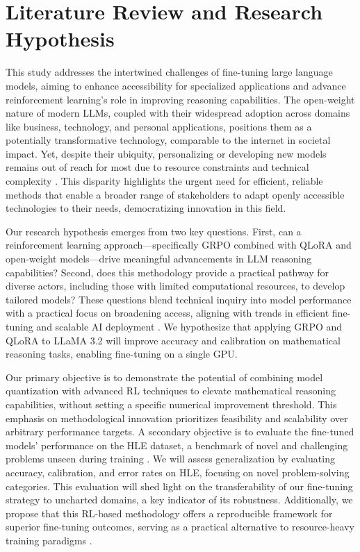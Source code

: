 \documentclass{svproc}
\begin{document}

\section{Literature Review and Research Hypothesis}

This study addresses the intertwined challenges of fine-tuning large language models, aiming to enhance accessibility for specialized applications and advance reinforcement learning’s role in improving reasoning capabilities. The open-weight nature of modern LLMs, coupled with their widespread adoption across domains like business, technology, and personal applications, positions them as a potentially transformative technology, comparable to the internet in societal impact. Yet, despite their ubiquity, personalizing or developing new models remains out of reach for most due to resource constraints and technical complexity \cite{dettmers2023qloraefficientfinetuningquantized}. This disparity highlights the urgent need for efficient, reliable methods that enable a broader range of stakeholders to adapt openly accessible technologies to their needs, democratizing innovation in this field.

Our research hypothesis emerges from two key questions. First, can a reinforcement learning approach—specifically GRPO combined with QLoRA and open-weight models—drive meaningful advancements in LLM reasoning capabilities? Second, does this methodology provide a practical pathway for diverse actors, including those with limited computational resources, to develop tailored models? These questions blend technical inquiry into model performance with a practical focus on broadening access, aligning with trends in efficient fine-tuning and scalable AI deployment \cite{dettmers2023qloraefficientfinetuningquantized}. We hypothesize that applying GRPO and QLoRA to LLaMA 3.2 will improve accuracy and calibration on mathematical reasoning tasks, enabling fine-tuning on a single GPU.

Our primary objective is to demonstrate the potential of combining model quantization with advanced RL techniques to elevate mathematical reasoning capabilities, without setting a specific numerical improvement threshold. This emphasis on methodological innovation prioritizes feasibility and scalability over arbitrary performance targets. A secondary objective is to evaluate the fine-tuned models’ performance on the HLE dataset, a benchmark of novel and challenging problems unseen during training \cite{phan2025humanitysexam}. We will assess generalization by evaluating accuracy, calibration, and error rates on HLE, focusing on novel problem-solving categories. This evaluation will shed light on the transferability of our fine-tuning strategy to uncharted domains, a key indicator of its robustness. Additionally, we propose that this RL-based methodology offers a reproducible framework for superior fine-tuning outcomes, serving as a practical alternative to resource-heavy training paradigms \cite{dettmers2023qloraefficientfinetuningquantized, shao2024deepseekmathpushinglimitsmathematical}.
\end{document}
